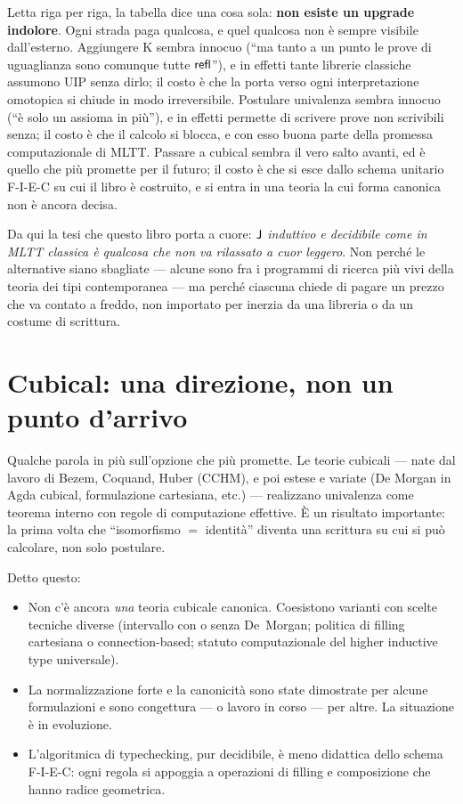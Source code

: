 \noindent Letta riga per riga, la tabella dice una cosa sola: \textbf{non esiste un upgrade indolore}. Ogni strada paga qualcosa, e quel qualcosa non \`e sempre visibile dall'esterno. Aggiungere K sembra innocuo (``ma tanto a un punto le prove di uguaglianza sono comunque tutte $\mathsf{refl}$''), e in effetti tante librerie classiche assumono UIP senza dirlo; il costo \`e che la porta verso ogni interpretazione omotopica si chiude in modo irreversibile. Postulare univalenza sembra innocuo (``\`e solo un assioma in pi\`u''), e in effetti permette di scrivere prove non scrivibili senza; il costo \`e che il calcolo si blocca, e con esso buona parte della promessa computazionale di MLTT. Passare a cubical sembra il vero salto avanti, ed \`e quello che pi\`u promette per il futuro; il costo \`e che si esce dallo schema unitario F-I-E-C su cui il libro \`e costruito, e si entra in una teoria la cui forma canonica non \`e ancora decisa.

\medskip

\noindent Da qui la tesi che questo libro porta a cuore: \emph{$\mathsf{J}$ induttivo e decidibile come in MLTT classica \`e qualcosa che non va rilassato a cuor leggero}. Non perch\'e le alternative siano sbagliate --- alcune sono fra i programmi di ricerca pi\`u vivi della teoria dei tipi contemporanea --- ma perch\'e ciascuna chiede di pagare un prezzo che va contato a freddo, non importato per inerzia da una libreria o da un costume di scrittura.

\section*{Cubical: una direzione, non un punto d'arrivo}

Qualche parola in pi\`u sull'opzione che pi\`u promette. Le teorie cubicali --- nate dal lavoro di Bezem, Coquand, Huber (CCHM), e poi estese e variate (De Morgan in Agda cubical, formulazione cartesiana, etc.) --- realizzano univalenza come teorema interno con regole di computazione effettive. \`E un risultato importante: la prima volta che ``isomorfismo $=$ identit\`a'' diventa una scrittura su cui si pu\`o calcolare, non solo postulare.

Detto questo:

\begin{itemize}
\item Non c'\`e ancora \emph{una} teoria cubicale canonica. Coesistono varianti con scelte tecniche diverse (intervallo con o senza De~Morgan; politica di filling cartesiana o connection-based; statuto computazionale del higher inductive type universale).
\item La normalizzazione forte e la canonicit\`a sono state dimostrate per alcune formulazioni e sono congettura --- o lavoro in corso --- per altre. La situazione \`e in evoluzione.
\item L'algoritmica di typechecking, pur decidibile, \`e meno didattica dello schema F-I-E-C: ogni regola si appoggia a operazioni di filling e composizione che hanno radice geometrica.
\end{itemize}


